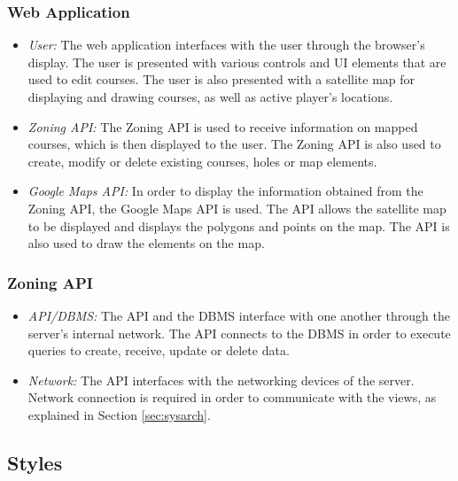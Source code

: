 \documentclass{article}
\begin{document}
    \subsubsection{Web Application}

    \begin{itemize}
        \item \textit{User:} The web application interfaces with the user
            through the browser's display. The user is presented with various
            controls and UI elements that are used to edit courses. The user is
            also presented with a satellite map for displaying and drawing
            courses, as well as active player's locations.
        \item \textit{Zoning API:} The Zoning API is used to receive
            information on mapped courses, which is then displayed to the user.
            The Zoning API is also used to create, modify or delete existing
            courses, holes or map elements.
        \item \textit{Google Maps API:} In order to display the information
            obtained from the Zoning API, the Google Maps API is used. The API
            allows the satellite map to be displayed and displays the polygons
            and points on the map. The API is also used to draw the elements on
            the map. 
    \end{itemize}

    \subsubsection{Zoning API}

    \begin{itemize}
        \item \textit{API/DBMS:} The API and the DBMS interface with one
            another through the server's internal network. The API connects to
            the DBMS in order to execute queries to create, receive, update or
            delete data.
        \item \textit{Network:} The API interfaces with the networking devices
            of the server. Network connection is required in order to
            communicate with the views, as explained in Section
            \ref{sec:sysarch}.
    \end{itemize}

    \subsection{Styles}
\end{document}
